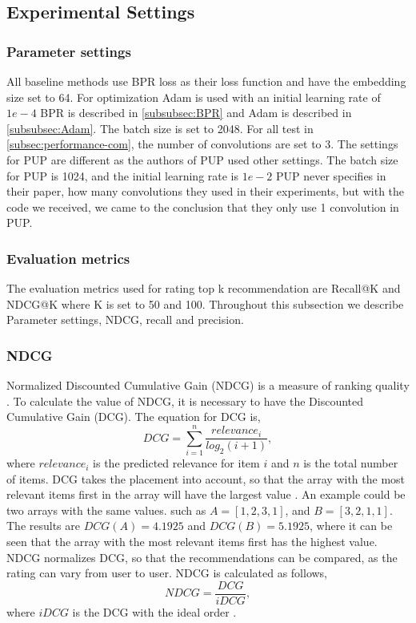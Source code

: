 \subsection{Experimental Settings}
\subsubsection{Parameter settings}
All baseline methods use BPR loss as their loss function and have the embedding size set to 64.
For optimization Adam is used with an initial learning rate of $1e-4$
BPR is described in \autoref{subsubsec:BPR} and Adam is described in \autoref{subsubsec:Adam}.
The batch size is set to 2048.
For all test in \autoref{subsec:performance-com}, the number of convolutions are set to 3.
The settings for PUP are different as the authors of PUP used other settings.
The batch size for PUP is 1024, and the initial learning rate is $1e-2$
PUP never specifies in their paper, how many convolutions they used in their experiments, but with the code we received, we came to the conclusion that they only use 1 convolution in PUP.

\subsubsection{Evaluation metrics}
The evaluation metrics used for rating top k recommendation are Recall@K and NDCG@K where K is set to 50 and 100.
Throughout this subsection we describe Parameter settings, NDCG, recall and precision.

\subsubsection{NDCG}
Normalized Discounted Cumulative Gain (NDCG) is a measure of ranking quality \cite{NDCG-evaluation}.
To calculate the value of NDCG, it is necessary to have the Discounted Cumulative Gain (DCG).
The equation for DCG is,
\begin{equation}
    DCG = \sum_{i=1}^{n} \frac{relevance_i}{log_2(i+1)},
\end{equation}
where $relevance_i$ is the predicted relevance for item $i$ and $n$ is the total number of items.
DCG takes the placement into account, so that the array with the most relevant items first in the array will have the largest value \cite{NDCG-evaluation,Handbook}.
An example could be two arrays with the same values. such as $A = [1, 2, 3, 1]$, and $B = [3, 2, 1, 1]$. The results are $DCG(A) = 4.1925$ and $DCG(B) = 5.1925$, where it can be seen that the array with the most relevant items first has the highest value.
NDCG normalizes DCG, so that the recommendations can be compared, as the rating can vary from user to user.
NDCG is calculated as follows,
\begin{equation}
    NDCG = \frac{DCG}{iDCG},
\end{equation}
where $iDCG$ is the DCG with the ideal order \cite{NDCG-evaluation,Handbook}.

